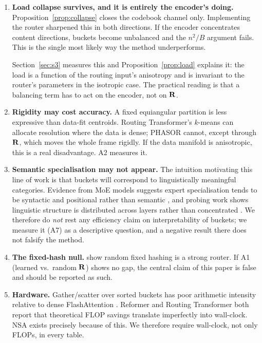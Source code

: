 \begin{enumerate}
\item \textbf{Load collapse survives, and it is entirely the encoder's doing.} Proposition~\ref{prop:collapse} closes the codebook channel only. Implementing the router sharpened this in both directions. If the encoder concentrates content directions, buckets become unbalanced and the $n^2/B$ argument fails. This is the single most likely way the method underperforms.

Section~\ref{sec:s3} measures this and Proposition~\ref{prop:load} explains it: the load is a function of the routing input's anisotropy and is invariant to the router's parameters in the isotropic case. The practical reading is that a balancing term has to act on the encoder, not on $\mathbf{R}$.

\item \textbf{Rigidity may cost accuracy.} A fixed equiangular partition is less expressive than data-fit centroids. Routing Transformer's $k$-means can allocate resolution where the data is dense; PHASOR cannot, except through $\mathbf{R}$, which moves the whole frame rigidly. If the data manifold is anisotropic, this is a real disadvantage. A2 measures it.
\item \textbf{Semantic specialisation may not appear.} The intuition motivating this line of work is that buckets will correspond to linguistically meaningful categories. Evidence from MoE models suggests expert specialisation tends to be syntactic and positional rather than semantic \citep{jiang2024mixtral}, and probing work shows linguistic structure is distributed across layers rather than concentrated \citep{tenney2019bert,clark2019bertlook}. We therefore do \emph{not} rest any efficiency claim on interpretability of buckets; we measure it (A7) as a descriptive question, and a negative result there does not falsify the method.
\item \textbf{The fixed-hash null.} \citet{roller2021hash} show random fixed hashing is a strong router. If A1 (learned vs.\ random $\mathbf{R}$) shows no gap, the central claim of this paper is false and should be reported as such.
\item \textbf{Hardware.} Gather/scatter over sorted buckets has poor arithmetic intensity relative to dense FlashAttention \citep{dao2022flashattention}. Reformer and Routing Transformer both report that theoretical FLOP savings translate imperfectly into wall-clock. NSA \citep{yuan2025nsa} exists precisely because of this. We therefore require wall-clock, not only FLOPs, in every table.
\end{enumerate}

